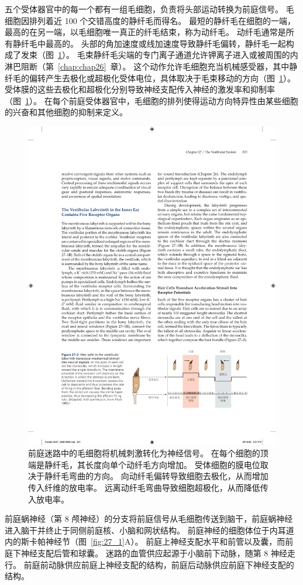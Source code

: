 五个受体器官中的每一个都有一组毛细胞，负责将头部运动转换为前庭信号。
毛细胞因排列着近 100 个交错高度的静纤毛而得名。
最短的静纤毛在细胞的一端，最高的在另一端，以毛细胞唯一真正的纤毛结束，称为动纤毛。
动纤毛通常是所有静纤毛中最高的。
头部的角加速度或线加速度导致静纤毛偏转，静纤毛一起构成了发束（图~\ref{fig:27_2}）。
毛束静纤毛尖端的专门离子通道允许钾离子进入或被周围的内淋巴阻断（第~\ref{chap:chap26}~章）。
这个动作允许毛细胞充当机械感受器，其中静纤毛的偏转产生去极化或超极化受体电位，具体取决于毛束移动的方向（图~\ref{fig:27_2}）。
受体膜的这些去极化和超极化分别导致神经支配传入神经的激发率和抑制率（图~\ref{fig:27_2}）。
在每个前庭受体器官中，毛细胞的排列使得运动方向特异性由某些细胞的兴奋和其他细胞的抑制来定义。


\begin{figure}[htbp]
	\centering
	\includegraphics[width=0.7\linewidth]{chap27/fig_27_2}
	\caption{前庭迷路中的毛细胞将机械刺激转化为神经信号。
		在每个细胞的顶端是静纤毛，其长度向单个动纤毛方向增加。
		受体细胞的膜电位取决于静纤毛弯曲的方向。
		向动纤毛偏转导致细胞去极化，从而增加传入纤维的放电率。
		远离动纤毛弯曲导致细胞超极化，从而降低传入放电率\cite{flock1965transducing}。}
	\label{fig:27_2}
\end{figure}


前庭蜗神经（第 8 颅神经）的分支将前庭信号从毛细胞传送到脑干，前庭蜗神经进入脑干并终止于同侧前庭核、小脑和网状结构。
前庭神经的细胞体位于内耳道内的斯卡帕神经节（图~\ref{fig:27_1}A）。
前庭上神经支配水平和前管以及囊，而前庭下神经支配后管和球囊。
迷路的血管供应起源于小脑前下动脉，随第 8 神经走行。
前庭前动脉供应前庭上神经支配的结构，前庭后动脉供应前庭下神经支配的结构。


